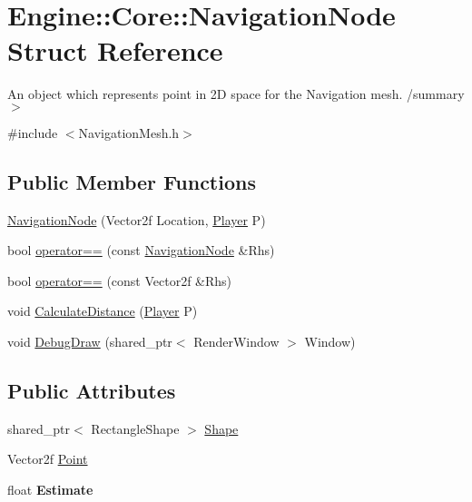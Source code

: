 \hypertarget{struct_engine_1_1_core_1_1_navigation_node}{}\section{Engine\+:\+:Core\+:\+:Navigation\+Node Struct Reference}
\label{struct_engine_1_1_core_1_1_navigation_node}


An object which represents point in 2D space for the Navigation mesh. /summary$>$  




{\ttfamily \#include $<$Navigation\+Mesh.\+h$>$}

\subsection*{Public Member Functions}
\begin{DoxyCompactItemize}
\item 
\hyperlink{struct_engine_1_1_core_1_1_navigation_node_ae3912b3f6efd3ba94b71bdab5d70a049}{Navigation\+Node} (Vector2f Location, \hyperlink{class_engine_1_1_game_play_1_1_player}{Player} P)
\item 
bool \hyperlink{struct_engine_1_1_core_1_1_navigation_node_a12cffe89f89aac9623ae2530dd556dc7}{operator==} (const \hyperlink{struct_engine_1_1_core_1_1_navigation_node}{Navigation\+Node} \&Rhs)
\item 
bool \hyperlink{struct_engine_1_1_core_1_1_navigation_node_a4093291628771c2de79b2b1a8ea2ec82}{operator==} (const Vector2f \&Rhs)
\item 
void \hyperlink{struct_engine_1_1_core_1_1_navigation_node_ac61bc4291a133693de436a3e875c8c39}{Calculate\+Distance} (\hyperlink{class_engine_1_1_game_play_1_1_player}{Player} P)
\item 
void \hyperlink{struct_engine_1_1_core_1_1_navigation_node_a453d05d915929841a1f3d8f228996d37}{Debug\+Draw} (shared\+\_\+ptr$<$ Render\+Window $>$ Window)
\end{DoxyCompactItemize}
\subsection*{Public Attributes}
\begin{DoxyCompactItemize}
\item 
shared\+\_\+ptr$<$ Rectangle\+Shape $>$ \hyperlink{struct_engine_1_1_core_1_1_navigation_node_a7a1470734947944ba351df516e2a7cc1}{Shape}
\item 
Vector2f \hyperlink{struct_engine_1_1_core_1_1_navigation_node_a09e7506d996f8bd91b478f3e013fd48e}{Point}
\item 
\mbox{\label{struct_engine_1_1_core_1_1_navigation_node_a707b571c58bffbf140fd4f6ebe6a4f37}} 
float {\bfseries Estimate}
\end{DoxyCompactItemize}


